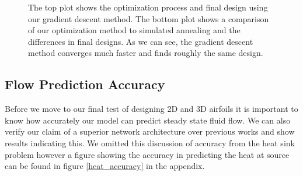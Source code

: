\documentclass{article} %
\begin{document}
\begin{figure}[h]
\begin{center}
\end{center}
\label{heat_sink_optimization}
\caption{The top plot shows the optimization process and final design using our gradient descent method. The bottom plot shows a comparison of our optimization method to simulated annealing and the differences in final designs. As we can see, the gradient descent method converges much faster and finds roughly the same design. }
\end{figure}

\begin{figure}[h]
\begin{center}
\end{center}
\end{figure}


\subsection{Flow Prediction Accuracy}

Before we move to our final test of designing 2D and 3D airfoils it is important to know how accurately our model can predict steady state fluid flow. We can also verify our claim of a superior network architecture over previous works and show results indicating this. We omitted this discussion of accuracy from the heat sink problem however a figure showing the accuracy in predicting the heat at source can be found in figure \ref{heat_accuracy} in the appendix.
\end{document}
